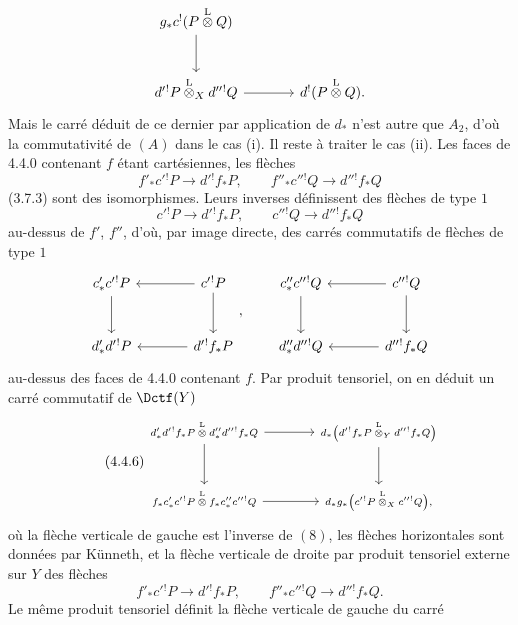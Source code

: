 \begin{prooftext}[Démonstration -]
\[\begin{tikzcd}[column sep=large,row sep=large]
g_*c^!(P\overset{\mathrm{L}}{\otimes}Q)\arrow[d]\\
d'{}^!P\overset{\mathrm{L}}{\otimes}_Xd''{}^!Q \arrow[r] &
d^!(P\overset{\mathrm{L}}{\otimes}Q).
\end{tikzcd}
\]
Mais le carré déduit de ce dernier par application de $d_*$ n'est autre que $A_2$, d'où la commutativité de $(A)$ dans le cas (i). Il reste à traiter le cas (ii). Les faces de 4.4.0 contenant $f$ étant cartésiennes, les flèches
\[
f'_*c'{}^!P\longrightarrow d'{}^!f_*P,\qquad
f''_*c''{}^!Q\longrightarrow d''{}^!f_*Q
\]
(3.7.3) sont des isomorphismes. Leurs inverses définissent des flèches de type $1$
\[
c'{}^!P\longrightarrow d'{}^!f_*P,\qquad
c''{}^!Q\longrightarrow d''{}^!f_*Q
\]
au-dessus de $f'$, $f''$, d'où, par image directe, des carrés commutatifs de flèches de type $1$
\[
\begin{tikzcd}[column sep=large,row sep=large]
c'_*c'{}^!P \arrow[d] & c'{}^!P\arrow[l]\arrow[d]\\
d'_*d'{}^!P & d'{}^!f_*P\arrow[l]
\end{tikzcd}
,\qquad
\begin{tikzcd}[column sep=large,row sep=large]
c''_*c''{}^!Q \arrow[d] & c''{}^!Q\arrow[l]\arrow[d]\\
d''_*d''{}^!Q & d''{}^!f_*Q\arrow[l]
\end{tikzcd}
\]
au-dessus des faces de 4.4.0 contenant $f$. Par produit tensoriel, on en déduit un carré commutatif de $\Dctf(Y)$
\begin{equation}
\tag{4.4.6}
\begin{tikzcd}[column sep=large,row sep=large,cells={nodes={font=\scriptsize}},every label/.append style={font=\scriptsize}]
d'_*d'{}^!f_*P\overset{\mathrm{L}}{\otimes}d''_*d''{}^!f_*Q
 \arrow[r]\arrow[d] &
d_*\bigl(d'{}^!f_*P\overset{\mathrm{L}}{\otimes}_Yd''{}^!f_*Q\bigr)\arrow[d]\\
f_*c'_*c'{}^!P\overset{\mathrm{L}}{\otimes}f_*c''_*c''{}^!Q
 \arrow[r] &
d_*g_*\bigl(c'{}^!P\overset{\mathrm{L}}{\otimes}_Xc''{}^!Q\bigr),
\end{tikzcd}
\end{equation}
où la flèche verticale de gauche est l'inverse de $(8)$, les flèches horizontales sont données par Künneth, et la flèche verticale de droite par produit tensoriel externe sur $Y$ des flèches
\[
f'_*c'{}^!P\longrightarrow d'{}^!f_*P,\qquad
f''_*c''{}^!Q\longrightarrow d''{}^!f_*Q.
\]
Le même produit tensoriel définit la flèche verticale de gauche du carré
\begin{equation}

\end{equation}
\end{prooftext}
